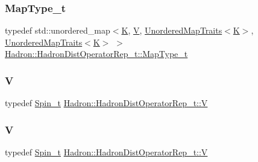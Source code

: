\subsubsection{\texorpdfstring{MapType\_t}{MapType\_t}\hspace{0.1cm}{\footnotesize\ttfamily [2/2]}}
{\footnotesize\ttfamily typedef std\+::unordered\+\_\+map$<$\mbox{\hyperlink{classHadron_1_1HadronDistOperatorRep__t_a670c7409bfd80616aeb0159590bcdb6b}{K}}, \mbox{\hyperlink{classHadron_1_1HadronDistOperatorRep__t_a40f37383ae57b1d0bbf944d698a10382}{V}}, \mbox{\hyperlink{structADAT_1_1UnorderedMapTraits}{Unordered\+Map\+Traits}}$<$\mbox{\hyperlink{classHadron_1_1HadronDistOperatorRep__t_a670c7409bfd80616aeb0159590bcdb6b}{K}}$>$, \mbox{\hyperlink{structADAT_1_1UnorderedMapTraits}{Unordered\+Map\+Traits}}$<$\mbox{\hyperlink{classHadron_1_1HadronDistOperatorRep__t_a670c7409bfd80616aeb0159590bcdb6b}{K}}$>$ $>$ \mbox{\hyperlink{classHadron_1_1HadronDistOperatorRep__t_a28874b1705be0d32099d426de9fb44c0}{Hadron\+::\+Hadron\+Dist\+Operator\+Rep\+\_\+t\+::\+Map\+Type\+\_\+t}}}

\mbox{\label{classHadron_1_1HadronDistOperatorRep__t_a40f37383ae57b1d0bbf944d698a10382}} 
\subsubsection{\texorpdfstring{V}{V}\hspace{0.1cm}{\footnotesize\ttfamily [1/2]}}
{\footnotesize\ttfamily typedef \mbox{\hyperlink{structHadron_1_1HadronDistOperatorRep__t_1_1Spin__t}{Spin\+\_\+t}} \mbox{\hyperlink{classHadron_1_1HadronDistOperatorRep__t_a40f37383ae57b1d0bbf944d698a10382}{Hadron\+::\+Hadron\+Dist\+Operator\+Rep\+\_\+t\+::V}}}

\mbox{\label{classHadron_1_1HadronDistOperatorRep__t_a40f37383ae57b1d0bbf944d698a10382}} 
\subsubsection{\texorpdfstring{V}{V}\hspace{0.1cm}{\footnotesize\ttfamily [2/2]}}
{\footnotesize\ttfamily typedef \mbox{\hyperlink{structHadron_1_1HadronDistOperatorRep__t_1_1Spin__t}{Spin\+\_\+t}} \mbox{\hyperlink{classHadron_1_1HadronDistOperatorRep__t_a40f37383ae57b1d0bbf944d698a10382}{Hadron\+::\+Hadron\+Dist\+Operator\+Rep\+\_\+t\+::V}}}



